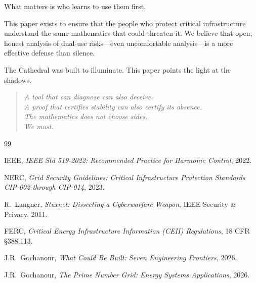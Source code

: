 \documentclass[11pt,a4paper]{article}
\begin{document}
What matters is who learns to use them first.

This paper exists to ensure that the people who protect critical
infrastructure understand the same mathematics that could threaten
it. We believe that open, honest analysis of dual-use risks---even
uncomfortable analysis---is a more effective defense than silence.

The Cathedral was built to illuminate. This paper points the light
at the shadows.

\begin{quote}
\emph{A tool that can diagnose can also deceive.\\
A proof that certifies stability can also certify its absence.\\
The mathematics does not choose sides.\\
We must.}
\end{quote}

\vspace{0.5cm}

\begin{thebibliography}{99}

IEEE, \emph{IEEE Std 519-2022: Recommended Practice for Harmonic
Control}, 2022.

NERC, \emph{Grid Security Guidelines: Critical Infrastructure
Protection Standards CIP-002 through CIP-014}, 2023.

R.~Langner, \emph{Stuxnet: Dissecting a Cyberwarfare Weapon},
IEEE Security \& Privacy, 2011.

FERC, \emph{Critical Energy Infrastructure Information (CEII)
Regulations}, 18 CFR \S 388.113.

J.R.~Gochanour, \emph{What Could Be Built: Seven Engineering
Frontiers}, 2026.

J.R.~Gochanour, \emph{The Prime Number Grid: Energy Systems
Applications}, 2026.

\end{thebibliography}
\end{document}
